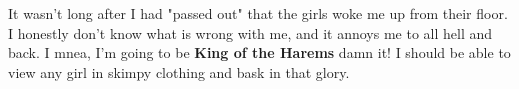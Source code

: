 \documentclass{article}
\begin{document}
It wasn't long after I had "passed out" that the girls woke me up from their floor. I honestly don't know what is wrong with me, and it annoys me to all hell and back. I mnea, I'm going to be \textbf{King of the Harems} damn it! I should be able to view any girl in skimpy clothing and bask in that glory.
\end{document}
